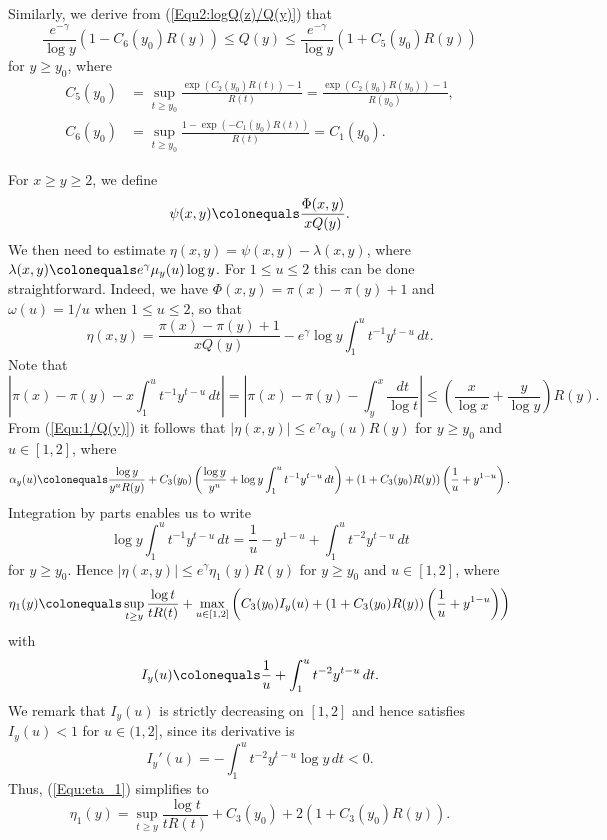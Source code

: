 \documentclass[12pt,reqno]{amsart}
\begin{document}
Similarly, we derive from (\ref{Equ2:logQ(z)/Q(y)}) that
\begin{equation}\label{Equ:Q(y)}
\frac{e^{-\gamma}}{\log y}(1-C_6(y_0)R(y))\le Q(y)\le \frac{e^{-\gamma}}{\log y}(1+C_5(y_0)R(y))
\end{equation}
for $y\ge y_0$, where
\begin{align*}
C_5(y_0)&=\sup_{t\ge y_0}\frac{\exp(C_2(y_0)R(t))-1}{R(t)}=\frac{\exp(C_2(y_0)R(y_0))-1}{R(y_0)},\\
C_6(y_0)&=\sup_{t\ge y_0}\frac{1-\exp(-C_1(y_0)R(t))}{R(t)}=C_1(y_0).
\end{align*}
\par For $x\ge y\ge 2$, we define 
\[\psi(x,y)\colonequals \frac{\Phi(x,y)}{xQ(y)}.\]
We then need to estimate $\eta(x,y)=\psi(x,y)-\lambda(x,y)$, where $\lambda(x,y)\colonequals e^{\gamma}\mu_y(u)\log y$. For $1\le u\le 2$ this can be done straightforward. Indeed, we have $\Phi(x,y)=\pi(x)-\pi(y)+1$ and $\omega(u)=1/u$ when $1\le u\le 2$, so that
\[\eta(x,y)=\frac{\pi(x)-\pi(y)+1}{xQ(y)}-e^{\gamma}\log y\int_{1}^{u}t^{-1}y^{t-u}\,dt.\]
Note that
\[\left|\pi(x)-\pi(y)-x\int_{1}^{u}t^{-1}y^{t-u}\,dt\right|=\left|\pi(x)-\pi(y)-\int_{y}^{x}\frac{dt}{\log t}\right|\le \left(\frac{x}{\log x}+\frac{y}{\log y}\right)R(y).\]
From (\ref{Equ:1/Q(y)}) it follows that $|\eta(x,y)|\le e^{\gamma}\alpha_y(u)R(y)$ for $y\ge y_0$ and $u\in[1,2]$, where
\[\alpha_y(u)\colonequals\frac{\log y}{y^uR(y)}+C_3(y_0)\left(\frac{\log y}{y^u}+\log y\int_{1}^{u}t^{-1}y^{t-u}\,dt\right)+(1+C_3(y_0)R(y))\left(\frac{1}{u}+y^{1-u}\right).\]
Integration by parts enables us to write
\begin{equation*}
\log y\int_{1}^{u}t^{-1}y^{t-u}\,dt=\frac{1}{u}-y^{1-u}+\int_{1}^{u}t^{-2}y^{t-u}\,dt
\end{equation*}
for $y\ge y_0$. Hence $|\eta(x,y)|\le e^{\gamma}\eta_1(y)R(y)$ for $y\ge y_0$ and $u\in[1,2]$, where
\begin{equation}\label{Equ:eta_1}
\eta_1(y)\colonequals\sup_{t\ge y}\frac{\log t}{tR(t)}+\max_{u\in[1,2]}\left(C_3(y_0)I_{y}(u)+(1+C_3(y_0)R(y))\left(\frac{1}{u}+y^{1-u}\right)\right)
\end{equation}
with 
\[I_{y}(u)\colonequals \frac{1}{u}+\int_{1}^{u}t^{-2}y^{t-u}\,dt.\]
We remark that $I_{y}(u)$ is strictly decreasing on $[1,2]$ and hence satisfies $I_{y}(u)<1$ for $u\in(1,2]$, since its derivative is
\[I_{y}'(u)=-\int_{1}^{u}t^{-2}y^{t-u}\log y\,dt<0.\]
Thus, (\ref{Equ:eta_1}) simplifies to 
\begin{equation}\label{Equ:eta_1'}
\eta_1(y)=\sup_{t\ge y}\frac{\log t}{tR(t)}+C_3(y_0)+2(1+C_3(y_0)R(y)).
\end{equation}
\end{document}
